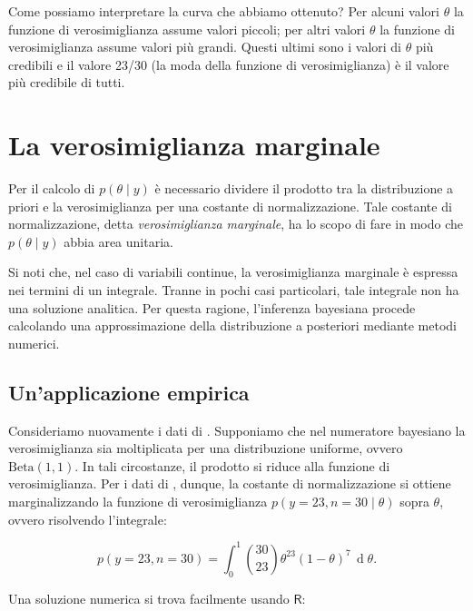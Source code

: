 \documentclass[
  11pt,
]{krantz}
\newcommand{\R}{\textsf{R}} %
\theoremstyle{definition}
\theoremstyle{definition}
\theoremstyle{definition}
\theoremstyle{definition}
\theoremstyle{remark}
\begin{document}
Come possiamo interpretare la curva che abbiamo ottenuto? Per alcuni valori \(\theta\) la funzione di verosimiglianza assume valori piccoli; per altri valori \(\theta\) la funzione di verosimiglianza assume valori più grandi. Questi ultimi sono i valori di \(\theta\) più credibili e il valore 23/30 (la moda della funzione di verosimiglianza) è il valore più credibile di tutti.

\hypertarget{sec:const-normaliz-bino23}{%
\section{La verosimiglianza marginale}\label{sec:const-normaliz-bino23}}

Per il calcolo di \(p(\theta \mid y)\) è necessario dividere il prodotto tra la distribuzione a priori e la verosimiglianza per una costante di normalizzazione. Tale costante di normalizzazione, detta \emph{verosimiglianza marginale}, ha lo scopo di fare in modo che \(p(\theta \mid y)\) abbia area unitaria.

Si noti che, nel caso di variabili continue, la verosimiglianza marginale è espressa nei termini di un integrale. Tranne in pochi casi particolari, tale integrale non ha una soluzione analitica. Per questa ragione, l'inferenza bayesiana procede calcolando una approssimazione della distribuzione a posteriori mediante metodi numerici.

\hypertarget{unapplicazione-empirica-2}{%
\subsection{Un'applicazione empirica}\label{unapplicazione-empirica-2}}

Consideriamo nuovamente i dati di \citet{zetschefuture2019}. Supponiamo che nel numeratore bayesiano la verosimiglianza sia moltiplicata per una distribuzione uniforme, ovvero \(\mbox{Beta}(1, 1)\). In tali circostanze, il prodotto si riduce alla funzione di verosimiglianza. Per i dati di \citet{zetschefuture2019}, dunque, la costante di normalizzazione si ottiene marginalizzando la funzione di verosimiglianza \(p(y = 23, n = 30 \mid \theta)\) sopra \(\theta\), ovvero risolvendo l'integrale:

\begin{equation}
p(y = 23, n = 30) = \int_0^1 \binom{30}{23} \theta^{23} (1-\theta)^{7} \,\operatorname {d}\!\theta.
\label{eq:intlikebino23}
\end{equation}

Una soluzione numerica si trova facilmente usando \(\R\):
\end{document}
